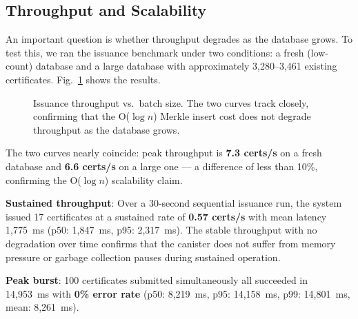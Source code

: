 \documentclass[journal]{IEEEtran}
\begin{document}
\subsection{Throughput and Scalability}

An important question is whether throughput degrades as the database grows. To test this, we ran the issuance benchmark under two conditions: a fresh (low-count) database and a large database with approximately 3,280--3,461 existing certificates. Fig.~\ref{fig:throughput} shows the results.

\begin{figure}[t]
\centering
{}
\caption{Issuance throughput vs.\ batch size. The two curves track closely, confirming that the O($\log n$) Merkle insert cost does not degrade throughput as the database grows.}
\label{fig:throughput}
\end{figure}

The two curves nearly coincide: peak throughput is \textbf{7.3 certs/s} on a fresh database and \textbf{6.6 certs/s} on a large one — a difference of less than 10\%, confirming the O($\log n$) scalability claim.

\textbf{Sustained throughput}: Over a 30-second sequential issuance run, the system issued 17 certificates at a sustained rate of \textbf{0.57 certs/s} with mean latency 1,775~ms (p50: 1,847~ms, p95: 2,317~ms). The stable throughput with no degradation over time confirms that the canister does not suffer from memory pressure or garbage collection pauses during sustained operation.

\textbf{Peak burst}: 100 certificates submitted simultaneously all succeeded in 14,953~ms with \textbf{0\% error rate} (p50: 8,219~ms, p95: 14,158~ms, p99: 14,801~ms, mean: 8,261~ms).
\end{document}
